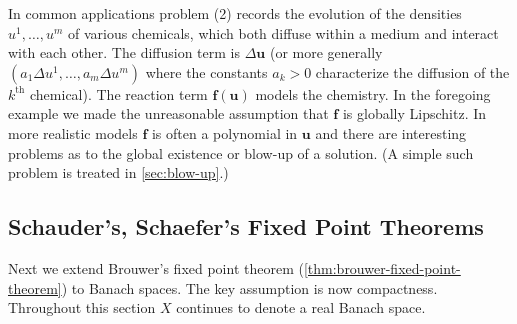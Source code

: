 \begin{remark}
\label{rem:reaction-diffusion-chemical-interpretation}
In common applications problem (2) records the evolution of the densities $u^1, \ldots, u^m$ of various chemicals, which both diffuse within a medium and interact with each other. The diffusion term is $\Delta \mathbf{u}$ (or more generally $(a_1 \Delta u^1, \ldots, a_m \Delta u^m)$ where the constants $a_k > 0$ characterize the diffusion of the $k^{\text{th}}$ chemical). The reaction term $\mathbf{f}(\mathbf{u})$ models the chemistry. In the foregoing example we made the unreasonable assumption that $\mathbf{f}$ is globally Lipschitz. In more realistic models $\mathbf{f}$ is often a polynomial in $\mathbf{u}$ and there are interesting problems as to the global existence or blow-up of a solution. (A simple such problem is treated in \cref{sec:blow-up}.)
\end{remark}

\subsection{Schauder's, Schaefer's Fixed Point Theorems}
\label{sec:schauder-schaefer-fixed-point-theorems}

Next we extend Brouwer's fixed point theorem (\cref{thm:brouwer-fixed-point-theorem}) to Banach spaces. The key assumption is now compactness. Throughout this section $X$ continues to denote a real Banach space.

